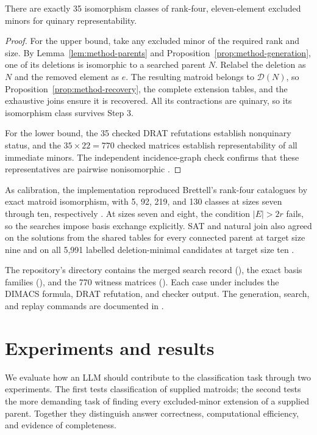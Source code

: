 \documentclass[11pt,letterpaper,titlepage]{article}
\begin{document}
\begin{theorem}
There are exactly 35 isomorphism classes of rank-four, eleven-element excluded minors for quinary representability.
\end{theorem}
\begin{proof}
For the upper bound, take any excluded minor of the required rank and size. By Lemma~\ref{lem:method-parents} and Proposition~\ref{prop:method-generation}, one of its deletions is isomorphic to a searched parent \(N\). Relabel the deletion as \(N\) and the removed element as \(e\). The resulting matroid belongs to \(\mathcal D(N)\), so Proposition~\ref{prop:method-recovery}, the complete extension tables, and the exhaustive joins ensure it is recovered. All its contractions are quinary, so its isomorphism class survives Step 3.

For the lower bound, the 35 checked DRAT refutations establish nonquinary status, and the \(35\times 22=770\) checked matrices establish representability of all immediate minors. The independent incidence-graph check confirms that these representatives are pairwise nonisomorphic \cite{verification}.
\end{proof}

As calibration, the implementation reproduced Brettell's rank-four catalogues by exact matroid isomorphism, with 5, 92, 219, and 130 classes at sizes seven through ten, respectively \cite{brettell,verification}. At sizes seven and eight, the condition \(|E|>2r\) fails, so the searches impose basis exchange explicitly. SAT and natural join also agreed on the solutions from the shared tables for every connected parent at target size nine and on all 5,991 labelled deletion-minimal candidates at target size ten \cite{classification-paper,verification}.

The repository's  directory contains the merged search record (), the exact basis families (), and the 770 witness matrices (). Each case under  includes the DIMACS formula, DRAT refutation, and checker output. The generation, search, and replay commands are documented in  \cite{repo}.


\section{Experiments and results}

We evaluate how an LLM should contribute to the classification task through two experiments. The first tests classification of supplied matroids; the second tests the more demanding task of finding every excluded-minor extension of a supplied parent. Together they distinguish answer correctness, computational efficiency, and evidence of completeness.
\end{document}
